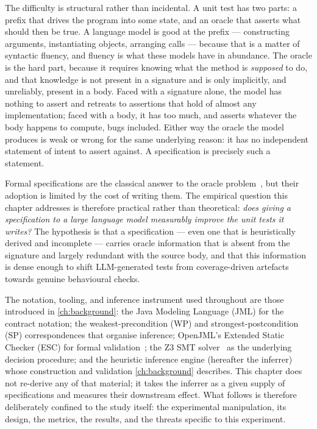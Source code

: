 The difficulty is structural rather than incidental. A unit test has two parts: a
prefix that drives the program into some state, and an oracle that asserts what
should then be true. A language model is good at the prefix --- constructing
arguments, instantiating objects, arranging calls --- because that is a matter of
syntactic fluency, and fluency is what these models have in abundance. The oracle
is the hard part, because it requires knowing what the method is \emph{supposed} to
do, and that knowledge is not present in a signature and is only implicitly, and
unreliably, present in a body. Faced with a signature alone, the model has nothing
to assert and retreats to assertions that hold of almost any implementation; faced
with a body, it has too much, and asserts whatever the body happens to compute,
bugs included. Either way the oracle the model produces is weak or wrong for the
same underlying reason: it has no independent statement of intent to assert
against. A specification is precisely such a statement.

Formal specifications are the classical answer to the oracle
problem~\citep{meyer1992dbc,leavens2006jml}, but their adoption is limited by the
cost of writing them. The empirical question this chapter addresses is therefore
practical rather than theoretical: \emph{does giving a specification to a large
language model measurably improve the unit tests it writes?} The hypothesis is
that a specification --- even one that is heuristically derived and incomplete ---
carries oracle information that is absent from the signature and largely redundant
with the source body, and that this information is dense enough to shift
LLM-generated tests from coverage-driven artefacts towards genuine behavioural
checks.

The notation, tooling, and inference instrument used throughout are those
introduced in \cref{ch:background}: the Java Modeling Language (JML) for the
contract notation; the weakest-precondition (WP) and strongest-postcondition (SP)
correspondences that organise inference; OpenJML's Extended Static Checker (ESC)
for formal validation~\citep{cok2014openjml}; the Z3 SMT solver~\citep{demoura2008z3}
as the underlying decision procedure; and the heuristic inference engine
(hereafter the inferrer) whose construction and validation \cref{ch:background}
describes. This chapter does not re-derive any of that material; it takes the
inferrer as a given supply of specifications and measures their downstream effect.
What follows is therefore deliberately confined to the study itself: the
experimental manipulation, its design, the metrics, the results, and the threats
specific to this experiment.

